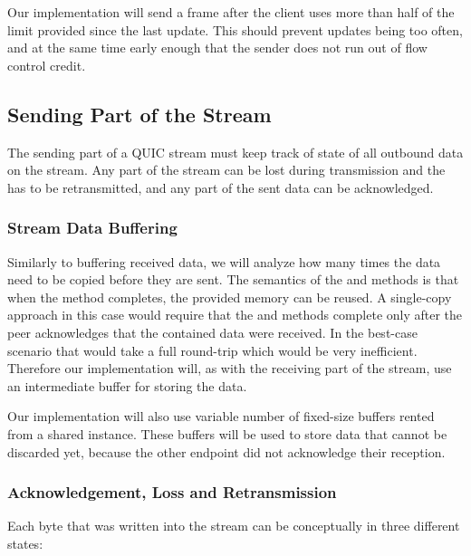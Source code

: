 
Our implementation will send a \MAXSTREAMDATA{} frame after the client uses more than half of the
limit provided since the last update. This should prevent updates being too often, and at
the same time early enough that the sender does not run out of flow control credit.

\subsection{Sending Part of the Stream}

The sending part of a QUIC stream must keep track of state of all outbound data on the stream. Any
part of the stream can be lost during transmission and the has to be retransmitted, and any part of
the sent data can be acknowledged.

\subsubsection{Stream Data Buffering}

Similarly to buffering received data, we will analyze how many times the data need to be copied
before they are sent. The semantics of the  and  methods is that
when the method completes, the provided memory can be reused.  A
single-copy approach in this case would require that the  and 
methods complete only after the peer acknowledges that the contained data were received. In the
best-case scenario that would take a full round-trip which would be very inefficient. Therefore our
implementation will, as with the receiving part of the stream, use an intermediate buffer for
storing the data.

Our implementation will also use variable number of fixed-size buffers rented from a shared
 instance. These buffers will be used to store data that cannot be discarded
yet, because the other endpoint did not acknowledge their reception.

\subsubsection{Acknowledgement, Loss and Retransmission}

Each byte that was written into the stream can be conceptually in three different states:

